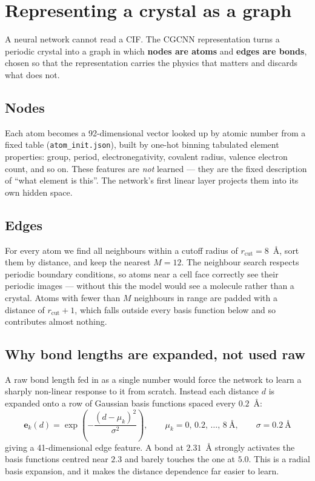 \documentclass[11pt,a4paper]{article}
\begin{document}
\section{Representing a crystal as a graph}

A neural network cannot read a CIF. The CGCNN representation turns a periodic
crystal into a graph in which \textbf{nodes are atoms} and \textbf{edges are
bonds}, chosen so that the representation carries the physics that matters and
discards what does not.

\subsection{Nodes}

Each atom becomes a 92-dimensional vector looked up by atomic number from a
fixed table (\texttt{atom\_init.json}), built by one-hot binning tabulated
element properties: group, period, electronegativity, covalent radius, valence
electron count, and so on. These features are \emph{not} learned --- they are
the fixed description of ``what element is this''. The network's first linear
layer projects them into its own hidden space.

\subsection{Edges}

For every atom we find all neighbours within a cutoff radius of
$r_{\mathrm{cut}} = 8$~\AA, sort them by distance, and keep the nearest
$M = 12$. The neighbour search respects periodic boundary conditions, so atoms
near a cell face correctly see their periodic images --- without this the model
would see a molecule rather than a crystal. Atoms with fewer than $M$ neighbours
in range are padded with a distance of $r_{\mathrm{cut}} + 1$, which falls
outside every basis function below and so contributes almost nothing.

\subsection{Why bond lengths are expanded, not used raw}

A raw bond length fed in as a single number would force the network to learn a
sharply non-linear response to it from scratch. Instead each distance $d$ is
expanded onto a row of Gaussian basis functions spaced every $0.2$~\AA:
\begin{equation}
  \mathbf{e}_k(d) = \exp\!\left(-\frac{(d - \mu_k)^2}{\sigma^2}\right),
  \qquad \mu_k = 0,\,0.2,\,\dots,\,8~\text{\AA},\qquad \sigma = 0.2~\text{\AA}
\end{equation}
giving a 41-dimensional edge feature. A bond at $2.31$~\AA{} strongly activates
the basis functions centred near $2.3$ and barely touches the one at $5.0$. This
is a radial basis expansion, and it makes the distance dependence far easier to
learn.
\end{document}
